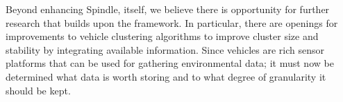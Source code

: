 \documentclass{thesis}
\begin{document}

    Beyond enhancing Spindle, itself, we believe there is opportunity for further research that builds
    upon the framework. In particular, there are openings for improvements to vehicle clustering algorithms
    to improve cluster size and stability by integrating available information. 
    Since vehicles are rich sensor platforms that can be used for gathering environmental data; it must now be determined what data is worth storing and to what degree of granularity it should be kept.

\begin{singlespace}


\end{singlespace}
\end{document}
